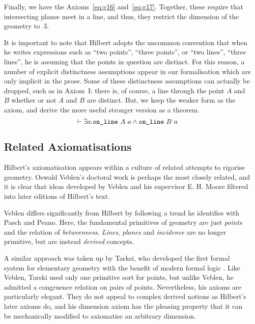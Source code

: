 Finally, we have the Axioms~\ref{eq:g16} and~\ref{eq:g17}. Together, these require that intersecting planes meet in a line, and thus, they restrict the dimension of the geometry to~3.

It is important to note that Hilbert adopts the uncommon convention that when he writes expressions such as ``two points'', ``three points'', or ``two lines'', ``three lines'', he is assuming that the points in question are distinct. For this reason, a number of explicit distinctness assumptions appear in our formalisation which are only implicit in the prose. Some of these distinctness assumptions can actually be dropped, such as in Axiom~I: there is, of course, a line through the point $A$ and $B$ whether or not $A$ and $B$ are distinct. But, we keep the weaker form as the axiom, and derive the more useful stronger version as a theorem.
\begin{displaymath}
  \vdash \exists a. \texttt{on\_line}\ A\ a \wedge \texttt{on\_line}\ B\ a
\end{displaymath}

\subsection{Related Axiomatisations}
Hilbert's axiomatisation appears within a culture of related attempts to rigorise geometry. Oswald Veblen's doctoral work \cite{Veblenphd} is perhaps the most closely related, and it is clear that ideas developed by Veblen and his supervisor E. H. Moore filtered into later editions of Hilbert's text.

Veblen differs significantly from Hilbert by following a trend he identifies with Pasch and Peano. Here, the fundamental primitives of geometry are just \emph{points} and the relation of \emph{betweenness}. \emph{Lines}, \emph{planes} and \emph{incidence} are no longer primitive, but are instead \emph{derived} concepts. 

A similar approach was taken up by Tarksi, who developed the first formal system for elementary geometry with the benefit of modern formal logic \cite{TarskiGeometrySystem}. Like Veblen, Tarski used only one primitive sort for points, but unlike Veblen, he admitted a congruence relation on pairs of points. Nevertheless, his axioms are particularly elegant. They do not appeal to complex derived notions as Hilbert's later axioms do, and his dimension axiom has the pleasing property that it can be mechanically modified to axiomatise an arbitrary dimension.

